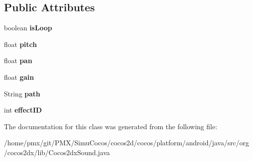 \subsection*{Public Attributes}
\begin{DoxyCompactItemize}
\item 
\mbox{\label{classorg_1_1cocos2dx_1_1lib_1_1Cocos2dxSound_1_1SoundInfoForLoadedCompleted_af3a87453ee63b029d68c1b45f863b632}} 
boolean {\bfseries is\+Loop}
\item 
\mbox{\label{classorg_1_1cocos2dx_1_1lib_1_1Cocos2dxSound_1_1SoundInfoForLoadedCompleted_aa1538bc9194e0fcb1fb60cea6bc79441}} 
float {\bfseries pitch}
\item 
\mbox{\label{classorg_1_1cocos2dx_1_1lib_1_1Cocos2dxSound_1_1SoundInfoForLoadedCompleted_a536c73c5102b09fc748a1df989278324}} 
float {\bfseries pan}
\item 
\mbox{\label{classorg_1_1cocos2dx_1_1lib_1_1Cocos2dxSound_1_1SoundInfoForLoadedCompleted_a8a819bbf78ae50ce829e6490b57b35bc}} 
float {\bfseries gain}
\item 
\mbox{\label{classorg_1_1cocos2dx_1_1lib_1_1Cocos2dxSound_1_1SoundInfoForLoadedCompleted_a94b8b8e588a98f4bca9e4fad6c74bb75}} 
String {\bfseries path}
\item 
\mbox{\label{classorg_1_1cocos2dx_1_1lib_1_1Cocos2dxSound_1_1SoundInfoForLoadedCompleted_a237d7019e2895b2e081539238be209a1}} 
int {\bfseries effect\+ID}
\end{DoxyCompactItemize}


The documentation for this class was generated from the following file\+:\begin{DoxyCompactItemize}
\item 
/home/pmx/git/\+P\+M\+X/\+Simu\+Cocos/cocos2d/cocos/platform/android/java/src/org/cocos2dx/lib/Cocos2dx\+Sound.\+java\end{DoxyCompactItemize}
